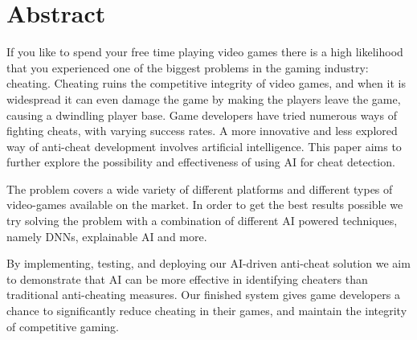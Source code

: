 \section{Abstract}
\label{ch:abstract}

If you like to spend your free time playing video games there is a high likelihood that you
experienced one of the biggest problems in the gaming industry: cheating. Cheating ruins the
competitive integrity of video games, and when it is widespread it can even damage the game by
making the players leave the game, causing a dwindling player base. Game developers have
tried numerous ways of fighting cheats, with varying success rates. A more innovative and less
explored way of anti-cheat development involves artificial intelligence. This paper aims to further explore the possibility
and effectiveness of using AI for cheat detection.

The problem covers a wide variety of different platforms and different types of video-games available on the market.
In order to get the best results possible we try solving the problem with a combination of different AI powered techniques, namely DNNs, explainable AI and more.

By implementing, testing, and deploying our AI-driven anti-cheat solution we aim to
demonstrate that AI can be more effective in identifying cheaters than traditional anti-cheating
measures. Our finished system gives game developers a chance to significantly reduce cheating
in their games, and maintain the integrity of competitive gaming.
